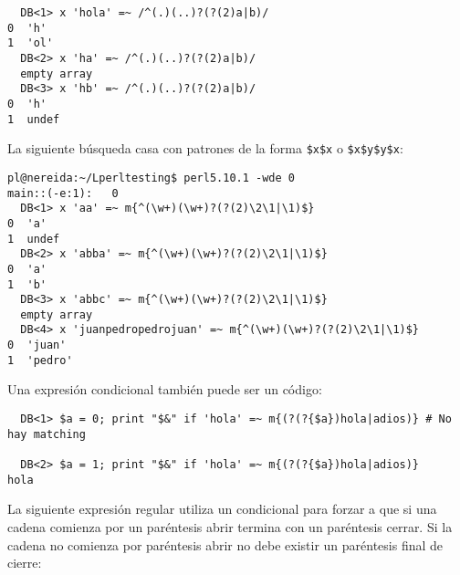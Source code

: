\begin{verbatim}
  DB<1> x 'hola' =~ /^(.)(..)?(?(2)a|b)/
0  'h'
1  'ol'
  DB<2> x 'ha' =~ /^(.)(..)?(?(2)a|b)/
  empty array
  DB<3> x 'hb' =~ /^(.)(..)?(?(2)a|b)/
0  'h'
1  undef
\end{verbatim}


La siguiente búsqueda casa con patrones de la forma 
\verb"$x$x" o \verb"$x$y$y$x":

\begin{verbatim}
pl@nereida:~/Lperltesting$ perl5.10.1 -wde 0
main::(-e:1):   0
  DB<1> x 'aa' =~ m{^(\w+)(\w+)?(?(2)\2\1|\1)$}
0  'a'
1  undef
  DB<2> x 'abba' =~ m{^(\w+)(\w+)?(?(2)\2\1|\1)$}
0  'a'
1  'b'
  DB<3> x 'abbc' =~ m{^(\w+)(\w+)?(?(2)\2\1|\1)$}
  empty array
  DB<4> x 'juanpedropedrojuan' =~ m{^(\w+)(\w+)?(?(2)\2\1|\1)$}
0  'juan'
1  'pedro'
\end{verbatim}

%
%
%

Una expresión condicional también puede ser un código:
\begin{verbatim}
  DB<1> $a = 0; print "$&" if 'hola' =~ m{(?(?{$a})hola|adios)} # No hay matching

  DB<2> $a = 1; print "$&" if 'hola' =~ m{(?(?{$a})hola|adios)}
hola
\end{verbatim}


La siguiente expresión regular utiliza un condicional
para forzar a que si una cadena comienza por un paréntesis
abrir termina con un paréntesis cerrar. Si la cadena 
no comienza por paréntesis abrir no debe existir un paréntesis
final de cierre:

